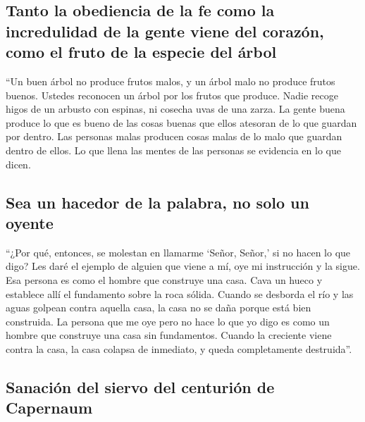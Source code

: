\hypertarget{tanto-la-obediencia-de-la-fe-como-la-incredulidad-de-la-gente-viene-del-corazuxf3n-como-el-fruto-de-la-especie-del-uxe1rbol}{%
\subsection{Tanto la obediencia de la fe como la incredulidad de la
gente viene del corazón, como el fruto de la especie del
árbol}\label{tanto-la-obediencia-de-la-fe-como-la-incredulidad-de-la-gente-viene-del-corazuxf3n-como-el-fruto-de-la-especie-del-uxe1rbol}}

 ``Un buen árbol no produce frutos malos, y un árbol malo
no produce frutos buenos.  Ustedes reconocen un árbol por
los frutos que produce. Nadie recoge higos de un arbusto con espinas, ni
cosecha uvas de una zarza.  La gente buena produce lo que
es bueno de las cosas buenas que ellos atesoran de lo que guardan por
dentro. Las personas malas producen cosas malas de lo malo que guardan
dentro de ellos. Lo que llena las mentes de las personas se evidencia en
lo que dicen.

\hypertarget{sea-un-hacedor-de-la-palabra-no-solo-un-oyente}{%
\subsection{Sea un hacedor de la palabra, no solo un
oyente}\label{sea-un-hacedor-de-la-palabra-no-solo-un-oyente}}

 ``¿Por qué, entonces, se molestan en llamarme `Señor,
Señor,' si no hacen lo que digo?  Les daré el ejemplo de
alguien que viene a mí, oye mi instrucción y la sigue. 
Esa persona es como el hombre que construye una casa. Cava un hueco y
establece allí el fundamento sobre la roca sólida. Cuando se desborda el
río y las aguas golpean contra aquella casa, la casa no se daña porque
está bien construida.  La persona que me oye pero no hace
lo que yo digo es como un hombre que construye una casa sin fundamentos.
Cuando la creciente viene contra la casa, la casa colapsa de inmediato,
y queda completamente destruida''.

\hypertarget{sanaciuxf3n-del-siervo-del-centuriuxf3n-de-capernaum}{%
\subsection{Sanación del siervo del centurión de
Capernaum}\label{sanaciuxf3n-del-siervo-del-centuriuxf3n-de-capernaum}}


